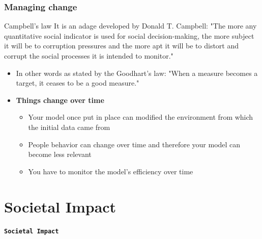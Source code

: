 \documentclass{beamer}
\newenvironment{colorblock}[2]
{\setbeamercolor{item}{fg=#1,bg=#1}\begin{beamerboxesrounded}[upper=#1,lower=#2,shadow=true]}
  {\end{beamerboxesrounded}}
\begin{document}
\begin{frame}\frametitle{Managing change}
\begin{block}{Campbell's law}
\justifying
It is an adage developed by Donald T. Campbell: "The more any quantitative social indicator is used for social decision-making, the more subject it will be to corruption pressures and the more apt it will be to distort and corrupt the social processes it is intended to monitor."
\end{block}
\begin{itemize}
	\setlength\itemsep{1em}
	\item In other words as stated by the Goodhart's law: "When a measure becomes a target, it ceases to be a good measure."
	\item {\bf Things change over time}
	\begin{itemize}
		\item Your model once put in place can modified the environment from which the initial data came from
		\item People behavior can change over time and therefore your model can become less relevant
		\item You have to monitor the model's efficiency over time
	\end{itemize}
\end{itemize}
\end{frame}

\section{Societal Impact}

\begin{frame}
 \begin{colorblock}{blue}{lightblue}{ }
  \begin{center}
    \Huge \textbf{\texttt{Societal Impact}}
  \end{center}
  \end{colorblock}
\end{frame}
\end{document}
